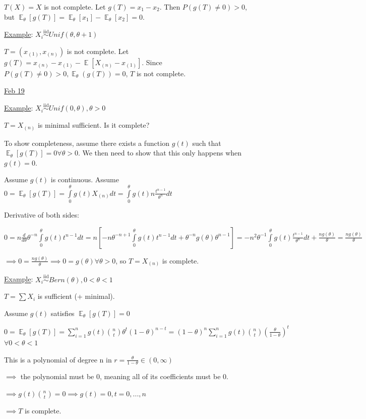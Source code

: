 \documentclass{article}
\DeclareMathOperator{\EX}{\mathbb{E}} %
\let\Oldint=\int
\let\Oldsum=\sum
\renewcommand{\int}{\Oldint\limits}
\renewcommand{\sum}{\Oldsum\limits}
\newcommand{\iiddist}{\overset{\mathrm{iid}}{\sim}}
\begin{document}
$T(X) = X$ is not complete. Let $g(T) = x_1 - x_2$. Then $P(g(T) \neq 0) > 0$, but $\EX_{\theta}[g(T)] = \EX_{\theta}[x_1] - \EX_{\theta}[x_2] = 0$.

\underline{Example}: $X_i \iiddist Unif(\theta, \theta + 1)$

$T = (x_{(1)}, x_{(n)})$ is not complete. Let $g(T) = x_{(n)} - x_{(1)} - \EX[X_{(n)} - x_{(1)}]$. Since $P(g(T) \neq 0) > 0, \EX_{\theta}(g(T)) = 0$, $T$ is not complete.

\underline{Feb 19}

\underline{Example}: $X_i \iiddist Unif(0, \theta), \theta > 0$

$T = X_{(n)}$ is minimal sufficient. Is it complete?

To show completeness, assume there exists a function $g(t)$ such that $\EX_{\theta}[g(T)] = 0 \forall \theta > 0$. We then need to show that this only happens when $g(t) = 0$.

Assume $g(t)$ is continuous. Assume $0 = \EX_{\theta}[g(T)] = \int_{0}^{\theta}g(t)X_{(n)}dt = \int_{0}^{\theta}g(t)n\frac{t^{n-1}}{\theta^n}dt$

Derivative of both sides:

$0 = n\frac{d}{d\theta}\theta^{-n}\int_0^{\theta}g(t)t^{n-1}dt = n\left[-n\theta^{-n+1}\int_0^{\theta}g(t)t^{n-1}dt + \theta^{-n}g(\theta)\theta^{n-1}\right] = -n^2 \theta^{-1} \int_0^{\theta}g(t)\frac{t^{n-1}}{\theta^n}dt + \frac{n g(\theta)}{\theta} = \frac{n g(\theta)}{\theta}$

$\implies 0 = \frac{n g(\theta)}{\theta} \implies 0 = g(\theta) \forall \theta > 0$, so $T=X_{(n)}$ is complete. 

\underline{Example}: $X_i \iiddist Bern(\theta), 0<\theta<1$

$T = \sum X_i$ is sufficient (+ minimal).

Assume $g(t)$ satisfies $\EX_{\theta}[g(T)] = 0$

$0 = \EX_{\theta}[g(T)] = \sum_{i=1}^n g(t)\binom{n}{t}\theta^t(1-\theta)^{n-t} = (1-\theta)^n \sum_{i=1}^n g(t)\binom{n}{t}\left(\frac{\theta}{1-\theta}\right)^t$ $\forall 0<\theta<1$

This is a polynomial of degree n in $r = \frac{\theta}{1-\theta} \in (0, \infty)$

$\implies$ the polynomial must be 0, meaning all of its coefficients must be 0.

$\implies g(t)\binom{n}{t} = 0 \implies g(t) = 0, t=0, ..., n$

$\implies T$ is complete. 
\end{document}

